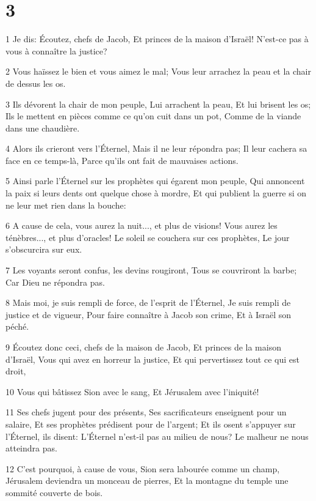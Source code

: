 \chapter{3}

\par 1 Je dis: Écoutez, chefs de Jacob, Et princes de la maison d'Israël! N'est-ce pas à vous à connaître la justice?
\par 2 Vous haïssez le bien et vous aimez le mal; Vous leur arrachez la peau et la chair de dessus les os.
\par 3 Ils dévorent la chair de mon peuple, Lui arrachent la peau, Et lui brisent les os; Ils le mettent en pièces comme ce qu'on cuit dans un pot, Comme de la viande dans une chaudière.
\par 4 Alors ils crieront vers l'Éternel, Mais il ne leur répondra pas; Il leur cachera sa face en ce temps-là, Parce qu'ils ont fait de mauvaises actions.
\par 5 Ainsi parle l'Éternel sur les prophètes qui égarent mon peuple, Qui annoncent la paix si leurs dents ont quelque chose à mordre, Et qui publient la guerre si on ne leur met rien dans la bouche:
\par 6 A cause de cela, vous aurez la nuit..., et plus de visions! Vous aurez les ténèbres..., et plus d'oracles! Le soleil se couchera sur ces prophètes, Le jour s'obscurcira sur eux.
\par 7 Les voyants seront confus, les devins rougiront, Tous se couvriront la barbe; Car Dieu ne répondra pas.
\par 8 Mais moi, je suis rempli de force, de l'esprit de l'Éternel, Je suis rempli de justice et de vigueur, Pour faire connaître à Jacob son crime, Et à Israël son péché.
\par 9 Écoutez donc ceci, chefs de la maison de Jacob, Et princes de la maison d'Israël, Vous qui avez en horreur la justice, Et qui pervertissez tout ce qui est droit,
\par 10 Vous qui bâtissez Sion avec le sang, Et Jérusalem avec l'iniquité!
\par 11 Ses chefs jugent pour des présents, Ses sacrificateurs enseignent pour un salaire, Et ses prophètes prédisent pour de l'argent; Et ils osent s'appuyer sur l'Éternel, ils disent: L'Éternel n'est-il pas au milieu de nous? Le malheur ne nous atteindra pas.
\par 12 C'est pourquoi, à cause de vous, Sion sera labourée comme un champ, Jérusalem deviendra un monceau de pierres, Et la montagne du temple une sommité couverte de bois.

